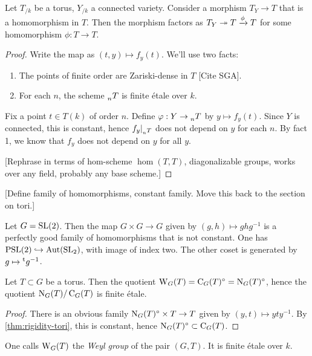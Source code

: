 \begin{theorem}\label{thm:rigidity-tori}
Let $T_{/k}$ be a torus, $Y_{/k}$ a connected variety. Consider a morphism 
$T_Y\to T$ that is a homomorphism in $T$. Then the morphism factors as 
$T_Y\twoheadrightarrow T\xrightarrow\phi T$ for some homomorphism $\phi:T\to T$. 
\end{theorem}
\begin{proof}
Write the map as $(t,y)\mapsto f_y(t)$. 
We'll use two facts:
\begin{enumerate}
\item The points of finite order are Zariski-dense in $T$ [Cite SGA].
\item For each $n$, the scheme $\prescript{}{n}{T}$ is finite \'etale over $k$. 
\end{enumerate}
Fix a point $t\in T(k)$ of order $n$. Define $\varphi:Y\to \prescript{}{n}{T}$ 
by $y\mapsto f_y(t)$. Since $Y$ is connected, this is constant, hence 
$f_y|_{\prescript{}{n}{T}}$ does not depend on $y$ for each $n$. By fact 1, we 
know that $f_y$ does not depend on $y$ for all $y$. 

[Rephrase in terms of hom-scheme $\hom(T,T)$, diagonalizable groups, works 
over any field, probably any base scheme.]
\end{proof}

[Define family of homomorphisms, constant family. Move this back to the 
section on tori.]

\begin{example}
Let $G=\operatorname{SL}(2)$. Then the map $G\times G\to G$ given by 
$(g,h)\mapsto g h g^{-1}$ is a perfectly good family of homomorphisms that 
is not constant. One has $\operatorname{PSL}(2)\hookrightarrow\operatorname{Aut}(\operatorname{SL}_2)$, with image of 
index two. The other coset is generated by $g\mapsto \prescript{\mathrm{t}}{}{g}^{-1}$. 
\end{example}

\begin{lemma}
Let $T\subset G$ be a torus. Then the quotient 
$\operatorname{W}_G(T)=\operatorname{C}_G(T)^\circ=\operatorname{N}_G(T)^\circ$, hence the quotient 
$\operatorname{N}_G(T)/\operatorname{C}_G(T)$ is finite \'etale. 
\end{lemma}
\begin{proof}
There is an obvious family $\operatorname{N}_G(T)^\circ\times T\to T$ given by 
$(y,t)\mapsto y t y^{-1}$. By \autoref{thm:rigidity-tori}, this is constant, 
hence $\operatorname{N}_G(T)^\circ\subset \operatorname{C}_G(T)$. 
\end{proof}

One calls $\operatorname{W}_G(T)$ the \emph{Weyl group} of the pair $(G,T)$. It is finite 
\'etale over $k$. 

